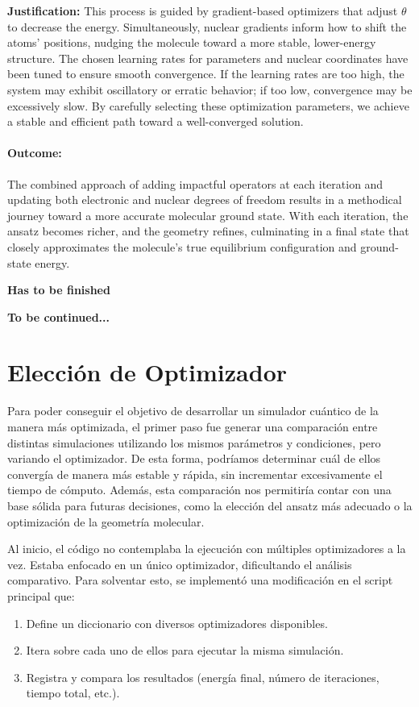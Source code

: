 \textbf{Justification:}  
This process is guided by gradient-based optimizers that adjust \(\theta\) to decrease the energy. Simultaneously, nuclear gradients inform how to shift the atoms' positions, nudging the molecule toward a more stable, lower-energy structure. The chosen learning rates for parameters and nuclear coordinates have been tuned to ensure smooth convergence. If the learning rates are too high, the system may exhibit oscillatory or erratic behavior; if too low, convergence may be excessively slow. By carefully selecting these optimization parameters, we achieve a stable and efficient path toward a well-converged solution.

\paragraph{Outcome:}  
The combined approach of adding impactful operators at each iteration and updating both electronic and nuclear degrees of freedom results in a methodical journey toward a more accurate molecular ground state. With each iteration, the ansatz becomes richer, and the geometry refines, culminating in a final state that closely approximates the molecule's true equilibrium configuration and ground-state energy.


\textbf{Has to be finished}

\textbf{To be continued...}
\section{Elección de Optimizador}

Para poder conseguir el objetivo de desarrollar un simulador cuántico de la manera más optimizada, el primer paso fue generar una comparación entre distintas simulaciones utilizando los mismos parámetros y condiciones, pero variando el optimizador. De esta forma, podríamos determinar cuál de ellos convergía de manera más estable y rápida, sin incrementar excesivamente el tiempo de cómputo. Además, esta comparación nos permitiría contar con una base sólida para futuras decisiones, como la elección del ansatz más adecuado o la optimización de la geometría molecular.

Al inicio, el código no contemplaba la ejecución con múltiples optimizadores a la vez. Estaba enfocado en un único optimizador, dificultando el análisis comparativo. Para solventar esto, se implementó una modificación en el script principal que:
\begin{enumerate}
    \item Define un diccionario con diversos optimizadores disponibles.
    \item Itera sobre cada uno de ellos para ejecutar la misma simulación.
    \item Registra y compara los resultados (energía final, número de iteraciones, tiempo total, etc.).
\end{enumerate}


